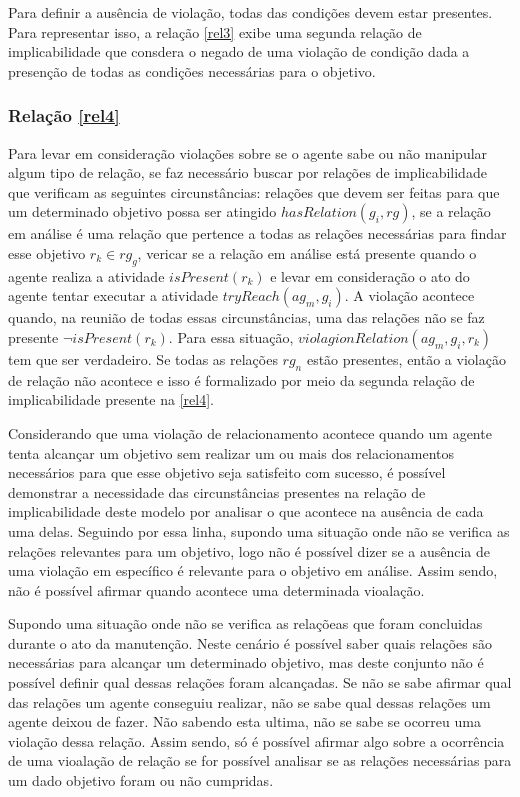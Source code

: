 \documentclass[12pt]{article}
\begin{document}
Para definir a ausência de violação, todas das condições devem estar presentes. Para representar isso, a relação \ref{rel3} exibe uma segunda relação de implicabilidade que consdera o negado de uma violação de condição dada a presenção de todas as condições necessárias para o objetivo. 

 
\subsubsection{Relação \ref{rel4}}
Para levar em consideração violações sobre se o agente sabe ou não manipular algum tipo de relação, se faz necessário buscar por relações de implicabilidade que verificam as seguintes circunstâncias: relações que devem ser feitas para que um determinado objetivo possa ser atingido $hasRelation(g_i,rg)$, se a relação em análise é uma relação que pertence a todas as relações necessárias para findar esse objetivo $r_k \in rg_g$, vericar se a relação em análise está presente quando o agente realiza a atividade $isPresent(r_k)$ e levar em consideração o ato do agente tentar executar a atividade $tryReach(ag_m,g_i)$.  A violação acontece quando, na reunião de todas essas circunstâncias, uma das relações não se faz presente $\neg isPresent(r_k)$. Para essa situação, $violagionRelation(ag_m,g_i,r_k)$ tem que ser verdadeiro. Se todas as relações $rg_n$ estão presentes, então a violação de relação não acontece e isso é formalizado por meio da segunda relação de implicabilidade presente na \ref{rel4}. 

Considerando que uma violação de relacionamento acontece quando um agente tenta alcançar um objetivo sem realizar um ou mais dos relacionamentos necessários para que esse objetivo seja satisfeito com sucesso, é possível demonstrar a necessidade das circunstâncias presentes na relação de implicabilidade deste modelo por analisar o que acontece na ausência de cada uma delas. Seguindo por essa linha, supondo uma situação onde não se verifica as relações relevantes para um objetivo, logo não é possível dizer se a ausência de uma violação em específico é relevante para o objetivo em análise. Assim sendo, não é possível afirmar quando acontece uma determinada vioalação. 

Supondo uma situação onde não se verifica as relaçõeas que foram concluidas durante o ato da manutenção. Neste cenário é possível saber quais relações são necessárias para alcançar um determinado objetivo, mas deste conjunto não é possível definir qual dessas relações foram alcançadas. Se não se sabe afirmar qual das relações um agente conseguiu realizar, não se sabe qual dessas relações um agente deixou de fazer. Não sabendo esta ultima, não se sabe se ocorreu uma violação dessa relação. Assim sendo, só é possível afirmar algo sobre a ocorrência de uma vioalação de relação se for possível analisar se as relações necessárias para um dado objetivo foram ou não cumpridas. 
\end{document}
